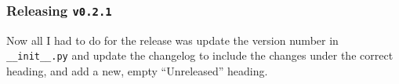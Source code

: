 \documentclass[../development.tex]{subfiles}
\begin{document}
\subsubsection{Releasing \texttt{v0.2.1}\label{development:preparing-for-v0.2.1:releasing-v0.2.1}}

Now all I had to do for the release was update the version number in \texttt{\_\_init\_\_.py} and update the changelog to include the changes under the correct heading, and add a new, empty \enquote{Unreleased} heading.


\end{document}
